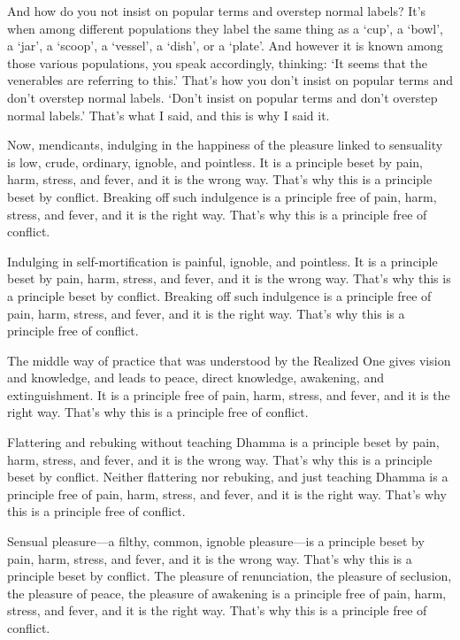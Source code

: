 \documentclass[12pt,openany]{book}%
\begin{document}
And how do you not insist on popular terms and overstep normal labels? It’s when among different populations they label the same thing as a ‘cup’, a ‘bowl’, a ‘jar’, a ‘scoop’, a ‘vessel’, a ‘dish’, or a ‘plate’. And however it is known among those various populations, you speak accordingly, thinking: ‘It seems that the venerables are referring to this.’ That’s how you don’t insist on popular terms and don’t overstep normal labels. ‘Don’t insist on popular terms and don’t overstep normal labels.’ That’s what I said, and this is why I said it. 

Now, mendicants, indulging in the happiness of the pleasure linked to sensuality is low, crude, ordinary, ignoble, and pointless. It is a principle beset by pain, harm, stress, and fever, and it is the wrong way. That’s why this is a principle beset by conflict. Breaking off such indulgence is a principle free of pain, harm, stress, and fever, and it is the right way. That’s why this is a principle free of conflict. 

Indulging in self-mortification is painful, ignoble, and pointless. It is a principle beset by pain, harm, stress, and fever, and it is the wrong way. That’s why this is a principle beset by conflict. Breaking off such indulgence is a principle free of pain, harm, stress, and fever, and it is the right way. That’s why this is a principle free of conflict. 

The middle way of practice that was understood by the Realized One gives vision and knowledge, and leads to peace, direct knowledge, awakening, and extinguishment. It is a principle free of pain, harm, stress, and fever, and it is the right way. That’s why this is a principle free of conflict. 

Flattering and rebuking without teaching Dhamma is a principle beset by pain, harm, stress, and fever, and it is the wrong way. That’s why this is a principle beset by conflict. Neither flattering nor rebuking, and just teaching Dhamma is a principle free of pain, harm, stress, and fever, and it is the right way. That’s why this is a principle free of conflict. 

Sensual pleasure—a filthy, common, ignoble pleasure—is a principle beset by pain, harm, stress, and fever, and it is the wrong way. That’s why this is a principle beset by conflict. The pleasure of renunciation, the pleasure of seclusion, the pleasure of peace, the pleasure of awakening is a principle free of pain, harm, stress, and fever, and it is the right way. That’s why this is a principle free of conflict. 
\end{document}
